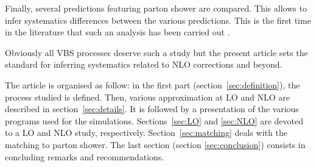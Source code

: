 Finally, several predictions featuring parton shower are compared.
This allows to infer systematics differences between the various predictions.
This is the first time in the literature that such an analysis has been carried out .

Obviously all VBS processes deserve such a study but the present article sets the standard for inferring systematics related to NLO corrections and beyond.


The article is organised as follow:
in the first part (section~\ref{sec:definition}), the process studied is defined.
Then, various approximation at LO and NLO are described in section~\ref{sec:details}.
It is followed by a presentation of the various programs used for the simulations.
Sections~\ref{sec:LO} and \ref{sec:NLO} are devoted to a LO and NLO study, respectively.
Section~\ref{sec:matching} deals with the matching to parton shower.
The last section (section \ref{sec:conclusion}) consists in concluding remarks and recommendations.
